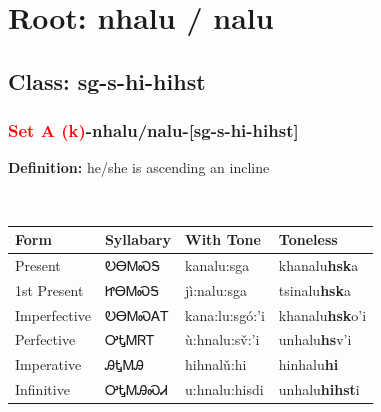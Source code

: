 \needspace{4in}
\section*{Root: nhalu / nalu}
\nopagebreak
{}
\needspace{3in}
\subsection*{Class: sg-s-hi-hihst}
\nopagebreak
\needspace{2in}
\subsubsection*{\textcolor{Red}{Set A (k)}{-}\textbf{nhalu/nalu}{-}[sg-s-hi-hihst]}
\nopagebreak
\textbf{Definition: } he/she is ascending an incline
\\[0.5em]
\begin{tabularx}{\textwidth}{l X X X}%
\toprule%
\textbf{Form}&\textbf{Syllabary}&\textbf{With Tone}&\textbf{Toneless}\\%
\midrule%
Present&ᎧᎾᎷᏍᎦ&kanalu:sga&khanalu\textbf{hsk}a\\%
1st Present&ᏥᎾᎷᏍᎦ&jì:nalu:sga&tsinalu\textbf{hsk}a\\%
Imperfective&ᎧᎾᎷᏍᎪᎢ&kana:lu:sgó:’i&khanalu\textbf{hsk}o'i\\%
Perfective&ᎤᎿᎷᏒᎢ&ù:hnalu:sv̌:’i&unhalu\textbf{hs}v'i\\%
Imperative&ᎯᎿᎷᎯ&hihnalǔ:hi&hinhalu\textbf{hi}\\%
Infinitive&ᎤᎿᎷᎯᏍᏗ&u:hnalu:hisdi&unhalu\textbf{hihst}i\\%
\bottomrule%
\end{tabularx}
\\[1em]